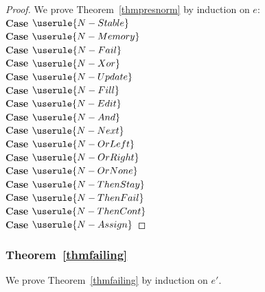 \begin{proof}
  We prove Theorem~\ref{thmpresnorm} by induction on $e$:\\

  \noindent\textbf{Case} $\userule{N-Stable}$\\

  \noindent\textbf{Case} $\userule{N-Memory}$\\

  \noindent\textbf{Case} $\userule{N-Fail}$ \\

  \noindent\textbf{Case} $\userule{N-Xor}$ \\

  \noindent\textbf{Case} $\userule{N-Update}$ \\

  \noindent\textbf{Case} $\userule{N-Fill}$ \\

  \noindent\textbf{Case} $\userule{N-Edit}$ \\

  \noindent\textbf{Case} $\userule{N-And}$ \\

  \noindent\textbf{Case} $\userule{N-Next}$ \\

  \noindent\textbf{Case} $\userule{N-OrLeft}$ \\

  \noindent\textbf{Case} $\userule{N-OrRight}$ \\

  \noindent\textbf{Case} $\userule{N-OrNone}$\\

  \noindent\textbf{Case} $\userule{N-ThenStay}$\\

  \noindent\textbf{Case} $\userule{N-ThenFail}$\\

  \noindent\textbf{Case} $\userule{N-ThenCont}$\\

  \noindent\textbf{Case} $\userule{N-Assign}$

\end{proof}

\subsubsection{Theorem~\ref{thmfailing}}

We prove Theorem~\ref{thmfailing} by induction on $e'$.

